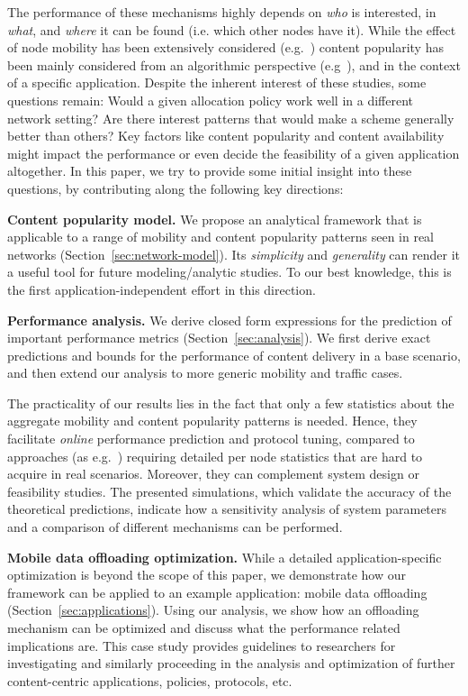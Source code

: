 \documentclass[journal]{IEEEtran}
\newcommand{\revisionRed}[1]{{#1}}\newcommand{\red}[1]{{#1}}
\begin{document}
The performance of these mechanisms highly depends on \textit{who} is interested, in \textit{what}, and \textit{where} it can be found (i.e. which other nodes have it). While the effect of node mobility has been extensively considered (e.g.~\cite{Gao-user-centric-DTN, contentplace, Picu:wowmom2012}) content popularity has been mainly considered from an algorithmic perspective (e.g~\cite{multiple-offloading,CEDO}), and in the context of a specific application. Despite the inherent interest of these studies, some questions remain:  Would a given allocation policy work well in a different network setting? Are there interest patterns that would make a scheme generally better than others? Key factors like content popularity and content availability might impact the performance or even decide the feasibility of a given application altogether. In this paper, we try to provide some initial insight into these questions, by contributing along the following key directions: 

\revisionRed{
\textbf{Content popularity model.} We propose an analytical framework that is applicable to a range of mobility and content popularity patterns seen in real networks (Section~\ref{sec:network-model}). Its \textit{simplicity} and \textit{generality} can render it a useful tool for future modeling/analytic studies. To our best knowledge, this is the first application-independent effort in this direction.
}

\revisionRed{\textbf{Performance analysis.} We derive closed form expressions for the prediction of important performance metrics (Section~\ref{sec:analysis}). We first derive exact predictions and bounds for the performance of content delivery in a base scenario, and then extend our analysis to more generic mobility and traffic cases.}

\revisionRed{The practicality of our results lies in the fact that only a few statistics about the aggregate mobility and content popularity patterns is needed. Hence, they facilitate \textit{online} performance prediction and protocol tuning, compared to approaches (as e.g.~\cite{multiple-offloading}) requiring detailed per node statistics that are hard to acquire in real scenarios. Moreover, they can complement system design or feasibility studies. The presented simulations, which validate the accuracy of the theoretical predictions, indicate how a sensitivity analysis of system parameters and a comparison of different mechanisms can be performed.}

\revisionRed{
\textbf{Mobile data offloading optimization.} While a detailed application-specific optimization is beyond the scope of this paper, we demonstrate how our framework can be applied to an example application: mobile data offloading  (Section~\ref{sec:applications}). Using our analysis, we show how an offloading mechanism can be optimized and discuss what the performance related implications are. This case study provides guidelines to researchers for investigating and similarly proceeding in the analysis and optimization of further content-centric applications, policies, protocols, etc.
}
\end{document}
